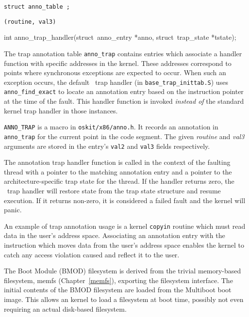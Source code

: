 \label{anno-trap}
\begin{apisyn}

	{\tt struct anno_table ;}

	{\tt {}(routine, val3)}

	\funcproto int anno_trap_handler(struct~anno_entry *anno,
		struct~trap_state *tstate);
\end{apisyn}
\begin{apidesc}
	The trap annotation table {\tt anno_trap} contains entries which
	associate a handler function with specific addresses in the kernel.
	These addresses correspond to points where synchronous exceptions
	are expected to occur.
	When such an exception occurs,
	the default \oskit\ trap handler (in {\tt base_trap_inittab.S})
	uses {\tt anno_find_exact} to locate an annotation entry based
	on the instruction pointer at the time of the fault.
	This handler function is invoked \emph{instead of}
	the standard kernel trap handler in those instances.

	{\tt ANNO_TRAP}
	is a macro in {\tt oskit/x86/anno.h}.
	It records an annotation in {\tt anno_trap}
	for the current point in the code segment.
	The given \emph{routine} and \emph{val3} arguments are stored in
	the entry's {\tt val2} and {\tt val3} fields respectively.

	The annotation trap handler function is called in the context
	of the faulting thread with a pointer to the matching annotation
	entry and a pointer to the architecture-specific trap state
	for the thread.
	If the handler returns zero, the \oskit\ trap handler will restore
	state from the trap state structure and resume execution.
	If it returns non-zero, it is considered a failed fault and the
	kernel will panic.

	An example of trap annotation usage is a kernel {\tt copyin} routine
	which must read data in the user's address space.
	Associating an annotation entry with the instruction which moves data
	from the user's address space enables the kernel to catch any access
	violation caused and reflect it to the user.
\end{apidesc}

\label{bmod-fs}

The Boot Module (BMOD) filesystem is derived from the 
trivial memory-based filesystem, memfs (Chapter~\ref{memfs}),
exporting
the \oskit{} filesystem interface.
The initial contents of the BMOD filesystem are loaded from the Multiboot
boot image.
This allows an \oskit{} kernel to load a filesystem at boot time,
possibly not even requiring an actual disk-based filesystem.

